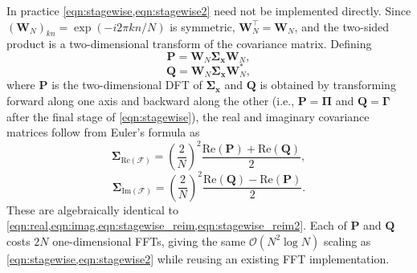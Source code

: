 \documentclass[reprint,
               superscriptaddress,
               nobibnotes,
               amsmath,
               amssymb,
               aps,
               hidelinks, 
               pre]{revtex4-2}
\begin{document}
In practice \cref{eqn:stagewise,eqn:stagewise2} need not be implemented directly.
Since $(\mathbf{W}_N)_{kn} = \exp(-i 2 \pi k n / N)$ is symmetric, $\mathbf{W}_N^\top = \mathbf{W}_N$, and the two-sided product is a two-dimensional transform of the covariance matrix. 
Defining
%
\begin{equation}
    \mathbf{P} = \mathbf{W}_N \boldsymbol{\Sigma}_{\mathbf{x}} \mathbf{W}_N,
\end{equation}
\begin{equation}
    \mathbf{Q} = \mathbf{W}_N \boldsymbol{\Sigma}_{\mathbf{x}} \mathbf{W}_N^{*},
    \label{eq:PQ}
\end{equation}
%
where $\mathbf{P}$ is the two-dimensional DFT of $\boldsymbol{\Sigma}_{\mathbf{x}}$ and $\mathbf{Q}$ is obtained by transforming forward along one axis and backward along the other (i.e., $\mathbf{P} = \boldsymbol{\Pi}$ and $\mathbf{Q} = \boldsymbol{\Gamma}$ after the final stage of \cref{eqn:stagewise}), the real and imaginary covariance matrices follow from Euler's formula as
%
\begin{equation}
    \boldsymbol{\Sigma}_{\mathrm{Re}(\boldsymbol{\mathcal{F}})}
        = \left( \frac{2}{N} \right)^{\!2}
          \frac{\mathrm{Re}(\mathbf{P}) + \mathrm{Re}(\mathbf{Q})}{2},
    \label{eq:fft_sigma_re}
\end{equation}
%
\begin{equation}
    \boldsymbol{\Sigma}_{\mathrm{Im}(\boldsymbol{\mathcal{F}})}
        = \left( \frac{2}{N} \right)^{\!2}
          \frac{\mathrm{Re}(\mathbf{Q}) - \mathrm{Re}(\mathbf{P})}{2}.
    \label{eq:fft_sigma_im}
\end{equation}
%
These are algebraically identical to \cref{eqn:real,eqn:imag,eqn:stagewise_reim,eqn:stagewise_reim2}.
Each of $\mathbf{P}$ and $\mathbf{Q}$ costs $2N$ one-dimensional FFTs, giving the same $\mathcal{O}(N^2 \log N)$ scaling as \cref{eqn:stagewise,eqn:stagewise2} while reusing an existing FFT implementation.


\end{document}

